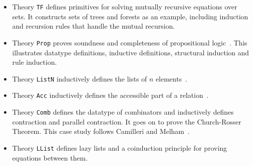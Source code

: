 \begin{itemize}
\item Theory \texttt{TF} defines primitives for solving mutually
  recursive equations over sets.  It constructs sets of trees and forests
  as an example, including induction and recursion rules that handle the
  mutual recursion.

\item Theory \texttt{Prop} proves soundness and completeness of
  propositional logic~\cite{paulson-set-II}.  This illustrates datatype
  definitions, inductive definitions, structural induction and rule
  induction.

\item Theory \texttt{ListN} inductively defines the lists of $n$
  elements~\cite{paulin92}.

\item Theory \texttt{Acc} inductively defines the accessible part of a
  relation~\cite{paulin92}.

\item Theory \texttt{Comb} defines the datatype of combinators and
  inductively defines contraction and parallel contraction.  It goes on to
  prove the Church-Rosser Theorem.  This case study follows Camilleri and
  Melham~\cite{camilleri92}.

\item Theory \texttt{LList} defines lazy lists and a coinduction
  principle for proving equations between them.
\end{itemize}


